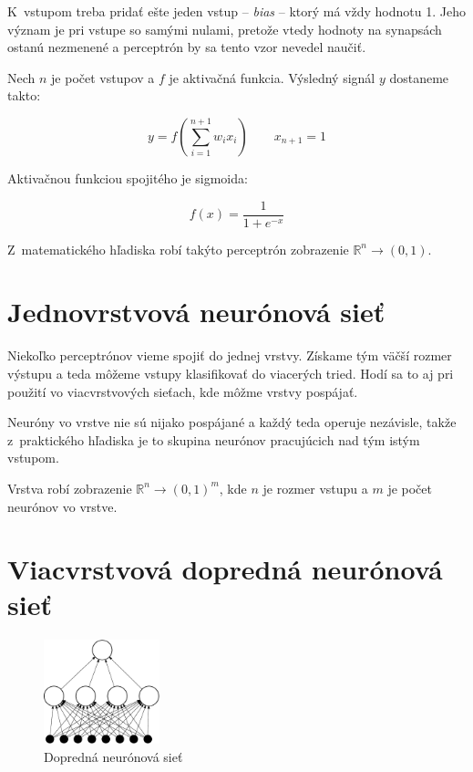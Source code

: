K~vstupom treba pridať ešte jeden vstup -- \textit{bias} -- ktorý má vždy hodnotu 1. Jeho význam je pri vstupe so samými nulami, pretože vtedy hodnoty na synapsách ostanú nezmenené a perceptrón by sa tento vzor nevedel naučiť.

Nech $n$ je počet vstupov a  $f$ je aktivačná funkcia. Výsledný signál $y$ dostaneme takto:

$$y= f\left(\sum_{i=1}^{n+1} w_i x_i \right)\qquad x_{n+1}=1$$\medskip

Aktivačnou funkciou spojitého je sigmoida: 

$$f(x) = \frac{1}{1+e^{-x}}$$\medskip

Z~matematického hľadiska robí takýto perceptrón zobrazenie $\mathbb{R}^n\rightarrow (0,1)$.

\section{Jednovrstvová neurónová sieť}

Niekoľko perceptrónov vieme spojiť do jednej vrstvy. Získame tým väčší rozmer výstupu a teda môžeme vstupy klasifikovať do viacerých tried. Hodí sa to aj pri použití vo viacvrstvových sieťach, kde môžme vrstvy pospájať.

Neuróny vo vrstve nie sú nijako pospájané a každý teda operuje nezávisle, takže z~praktického hľadiska je to skupina neurónov pracujúcich nad tým istým vstupom.

Vrstva robí zobrazenie $\mathbb{R}^n\rightarrow (0,1)^m$, kde $n$ je rozmer vstupu a $m$ je počet neurónov vo vrstve.

\section{Viacvrstvová dopredná neurónová sieť}\label{chap:ffnn}

\begin{figure}[htbp]
  \begin{center}
    \includegraphics[width=0.3\textwidth]{images/ffnn}
  \end{center}
  \caption{Dopredná neurónová sieť}
  \label{fig:ffnn}
\end{figure}

